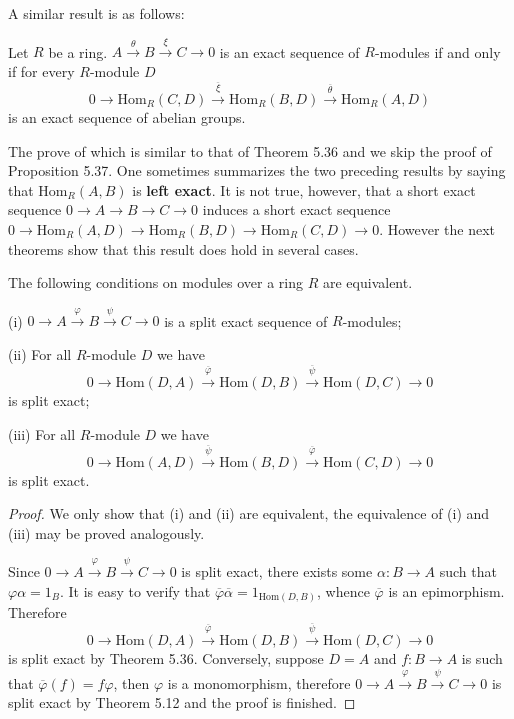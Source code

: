 A similar result is as follows: 
\begin{proposition}
Let $R$ be a ring. $A\overset{\theta}{\longrightarrow}B\overset{\xi}{\longrightarrow}C\longrightarrow 0$ is an exact sequence of $R$-modules if and only if for every $R$-module $D$ 
$$
0\longrightarrow \mathrm{Hom}_R\left( C,D \right) \overset{\overline{\xi }}{\longrightarrow}\mathrm{Hom}_R\left( B,D \right) \overset{\overline{\theta }}{\longrightarrow}\mathrm{Hom}_R\left( A,D \right) 
$$
is an exact sequence of abelian groups.
\end{proposition}
The prove of which is similar to that of Theorem 5.36 and we skip the proof of Proposition 5.37. One sometimes summarizes the two preceding results by saying that $\mathrm{Hom}_R(A,B)$ is \textbf{left exact}. It is not true, however, that a short exact sequence $0\longrightarrow A\longrightarrow B\longrightarrow C\longrightarrow 0$ induces a short exact sequence $0\longrightarrow \mathrm{Hom}_R\left( A,D \right) \longrightarrow \mathrm{Hom}_R\left( B,D \right) \longrightarrow \mathrm{Hom}_R\left( C,D \right) \longrightarrow 0$. However the next theorems show that this result does hold in several cases.
\begin{theorem}
The following conditions on modules over a ring $R$ are equivalent.\par
(i) $0\longrightarrow A\overset{\varphi}{\longrightarrow}B\overset{\psi}{\longrightarrow}C\longrightarrow 0$ is a split exact sequence of $R$-modules;\par
(ii) For all $R$-module $D$ we have 
$$
0\longrightarrow \mathrm{Hom}\left( D,A \right) \overset{\overline{\varphi }}{\longrightarrow}\mathrm{Hom}\left( D,B \right) \overset{\overline{\psi }}{\longrightarrow}\mathrm{Hom}\left( D,C \right) \longrightarrow 0
$$
is split exact;\par
(iii) For all $R$-module $D$ we have 
$$
0\longrightarrow \mathrm{Hom}\left( A,D \right) \overset{\overline{\psi }}{\longrightarrow}\mathrm{Hom}\left( B,D \right) \overset{\overline{\varphi }}{\longrightarrow}\mathrm{Hom}\left( C,D \right) \longrightarrow 0
$$
is split exact.
\end{theorem}
\begin{proof}
We only show that (i) and (ii) are equivalent, the equivalence of (i) and (iii) may be proved analogously.\par
Since $0\longrightarrow A\overset{\varphi}{\longrightarrow}B\overset{\psi}{\longrightarrow}C\longrightarrow 0$ is split exact, there exists some $\alpha:B\to A$ such that $\varphi\alpha=1_B$. It is easy to verify that $\overline{\varphi}\overline{\alpha}=1_{\mathrm{Hom}(D,B)}$, whence $\overline{\varphi}$ is an epimorphism. Therefore 
$$
0\longrightarrow \mathrm{Hom}\left( D,A \right) \overset{\overline{\varphi }}{\longrightarrow}\mathrm{Hom}\left( D,B \right) \overset{\overline{\psi }}{\longrightarrow}\mathrm{Hom}\left( D,C \right) \longrightarrow 0
$$
is split exact by Theorem 5.36. Conversely, suppose $D=A$ and $f:B\to A$ is such that $\overline{\varphi}(f)=f\varphi$, then $\varphi$ is a monomorphism, therefore $0\longrightarrow A\overset{\varphi}{\longrightarrow}B\overset{\psi}{\longrightarrow}C\longrightarrow 0$ is split exact by Theorem 5.12 and the proof is finished.
\end{proof}
